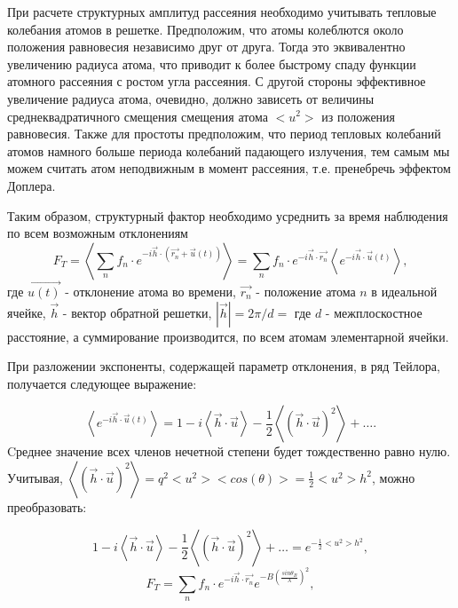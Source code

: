 
При расчете структурных амплитуд рассеяния необходимо учитывать
тепловые колебания атомов в решетке. Предположим, что атомы колеблются около положения
равновесия независимо друг от друга. Тогда это эквивалентно увеличению радиуса атома,
что приводит к более быстрому спаду функции атомного рассеяния с ростом угла рассеяния.
С другой стороны эффективное увеличение радиуса атома, очевидно, должно зависеть от
величины среднеквадратичного смещения смещения атома  $<u^2>$ из положения равновесия.
Также для простоты предположим, что период тепловых колебаний атомов намного больше периода
колебаний падающего излучения, тем самым мы можем считать атом неподвижным в момент рассеяния,
т.е. пренебречь эффектом Доплера.

Таким образом, структурный фактор необходимо усреднить за время наблюдения по всем возможным отклонениям
\begin{equation}
  F_T = \left\langle \sum_{n} f_n \cdot  e^{-i\vec {h} \cdot (\vec{r_n}+ \vec{u}(t))} \right\rangle =  \sum_{n} f_n \cdot  e^{-i\vec {h} \cdot \vec{r_n}}  \left\langle e^{-i \vec{h} \cdot \vec {u}(t)  } \right\rangle,
 \end{equation}
\noindent
где $\vec{u(t)}$ - отклонение атома во времени, $\vec{r_n}$ - положение атома $n$
в идеальной ячейке, $\vec{h}$ - вектор обратной решетки, $|\vec{h}| = 2 \pi / d = $ где $d$ - межплоскостное расстояние,
а суммирование производится, по всем атомам элементарной ячейки.

При разложении экспоненты, содержащей параметр отклонения, в ряд Тейлора, получается следующее выражение:

\begin{equation}
  \left\langle e^{-i \vec{h} \cdot \vec {u}(t)  } \right\rangle = 1 - i  \left\langle \vec{h} \cdot \vec {u} \right\rangle - \frac{1}{2} \left\langle (\vec{h} \cdot \vec {u})^2 \right\rangle+ \ldots .
 \end{equation}
\noindent
 Cреднее значение всех членов нечетной степени будет тождественно равно нулю.
Учитывая,  $ \left\langle (\vec{h} \cdot \vec {u})^2 \right\rangle = q^2 <u^2> <cos(\theta)> = \frac{1}{2}<u^2>h^2$, можно преобразовать:

\begin{equation}
1 - i  \left\langle \vec{h} \cdot \vec {u} \right\rangle - \frac{1}{2} \left\langle (\vec{h} \cdot \vec {u})^2 \right\rangle+ \ldots = e^{-\frac{1}{2} <u^2> h^2},
 \end{equation}
 \begin{equation}
   F_T =  \sum_{n} f_n \cdot  e^{-i\vec {h} \cdot \vec{r_n}}  e^{-B (\frac{sin\theta_B}{\lambda} )^2 },
  \end{equation}
\noindent

